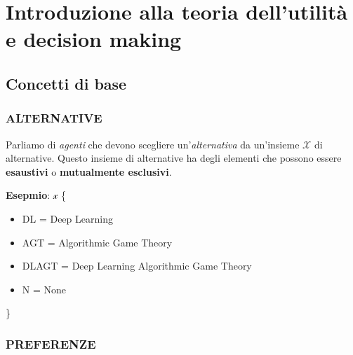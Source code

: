 \section{Introduzione alla teoria dell'utilità e decision making}
\subsection{Concetti di base}
\subsubsection{ALTERNATIVE}
Parliamo di \textit{agenti} che devono scegliere un'\textit{alternativa} da un'insieme $\mathcal{X}$ di alternative. 
Questo insieme di alternative ha degli elementi che possono essere \textbf{esaustivi} o \textbf{mutualmente esclusivi}.

\textbf{Esepmio}: $\mathcal{x}$ \{
\begin{itemize}
    \item DL = Deep Learning
    \item AGT = Algorithmic Game Theory
    \item DLAGT = Deep Learning Algorithmic Game Theory
    \item N = None
\end{itemize}
\}

\subsubsection{PREFERENZE}
